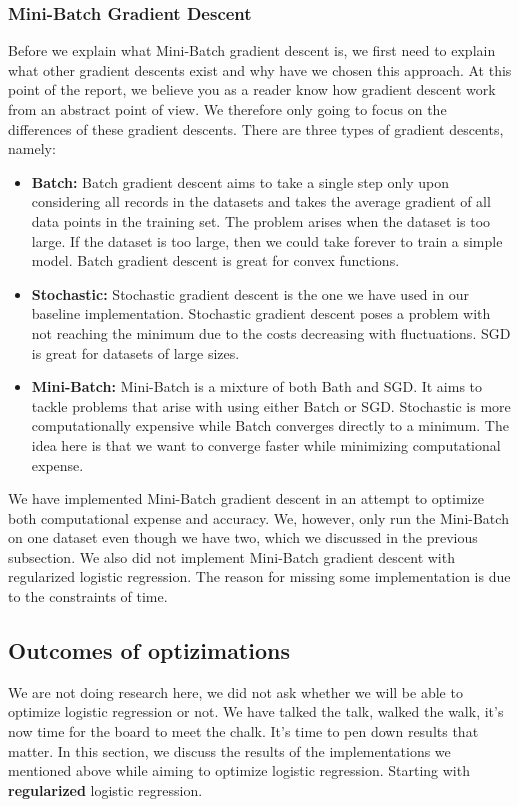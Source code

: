 \subsubsection{Mini-Batch Gradient Descent}
Before we explain what Mini-Batch gradient descent is, we first need to explain what other gradient descents exist and why have we chosen this approach. At this point of the report, we believe you as a reader know how gradient descent work from an abstract point of view. We therefore only going to focus on the differences of these gradient descents. There are three types of gradient descents, namely:
\begin{itemize}
    \item \textbf{Batch: }Batch gradient descent aims to take a single step only upon considering all records in the datasets and takes the average gradient of all data points in the training set. The problem arises when the dataset is too large. If the dataset is too large, then we could take forever to train a simple model. Batch gradient descent is great for convex functions.
    \item \textbf{Stochastic: }Stochastic gradient descent is the one we have used in our baseline implementation. Stochastic gradient descent poses a problem with not reaching the minimum due to the costs decreasing with fluctuations. SGD is great for datasets of large sizes.
    \item \textbf{Mini-Batch: }Mini-Batch is a mixture of both Bath and SGD. It aims to tackle problems that arise with using either Batch or SGD. Stochastic is more computationally expensive while Batch converges directly to a minimum. The idea here is that we want to converge faster while minimizing computational expense.
\end{itemize}

We have implemented Mini-Batch gradient descent in an attempt to optimize both computational expense and accuracy. We, however, only run the Mini-Batch on one dataset even though we have two, which we discussed in the previous subsection. We also did not implement Mini-Batch gradient descent with regularized logistic regression.  The reason for missing some implementation is due to the constraints of time.

\subsection{Outcomes of optizimations}
We are not doing research here, we did not ask whether we will be able to optimize logistic regression or not. We have talked the talk, walked the walk, it's now time for the board to meet the chalk. It's time to pen down results that matter. In this section, we discuss the results of the implementations we mentioned above while aiming to optimize logistic regression. Starting with \textbf{regularized} logistic regression.

